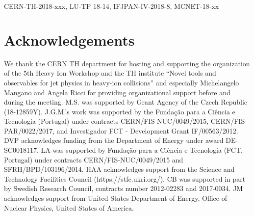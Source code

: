 \documentclass{article}
\begin{document}
\maketitle

\begin{abstract}
Studies of fully reconstructed QCD jets in heavy-ion collisions pursue to extracting properties of hot and dense nuclear matter. Most recently, substructure observables have opened new and exciting directions by introducing techniques amenable to dissecting jets and extending the plethora of established observables. This report, summarizing the main lines of discussion at the 5th Heavy Ion Jet Workshop and CERN TH institute ``Novel tools and observables for jet physics in heavy-ion collisions'' in 2017, presents a first attempt at outlining a strategy for isolating and identifying the relevant physical processes that are responsible for the observed modifications by combining theory insights with sophisticated jet reconstruction techniques, including grooming and background subtraction algorithms. 
\end{abstract}

\begin{flushright}
CERN-TH-2018-xxx, LU-TP 18-14, IFJPAN-IV-2018-8, MCNET-18-xx
\end{flushright}
%






\section*{Acknowledgements} 
We thank the CERN TH department for hosting and supporting the organization of the 5th Heavy Ion Workshop and the TH institute ``Novel tools and observables for jet physics in heavy-ion collisions'' and especially Michelangelo Mangano and Angela Ricci for providing organizational support before and during the meeting.
M.S. was supported by Grant Agency of the Czech Republic (18-12859Y).
J.G.M.'s work was supported  by the Funda{\c c}{\~ a}o para a Ci{\^ e}ncia e Tecnologia (Portugal) under contracts CERN/FIS-NUC/0049/2015, CERN/FIS-PAR/0022/2017, and Investigador FCT - Development Grant IF/00563/2012.
DVP acknowledges funding from the Department of Energy under award DE-SC0018117.
LA was supported by Funda{\c c}{\~ a}o para a Ci{\^ e}ncia e Tecnologia (FCT, Portugal) under contracts CERN/FIS-NUC/0049/2015 and SFRH/BPD/103196/2014.
HAA acknowledges support from the Science and Technology Facilities Council (https://stfc.ukri.org/).
CB was supported in part by Swedish Research Council, contracts number 2012-02283 and 2017-0034.
JM acknowledges support from United States Department of Energy, Office of Nuclear Physics, United States of America.

\appendix




\end{document}
